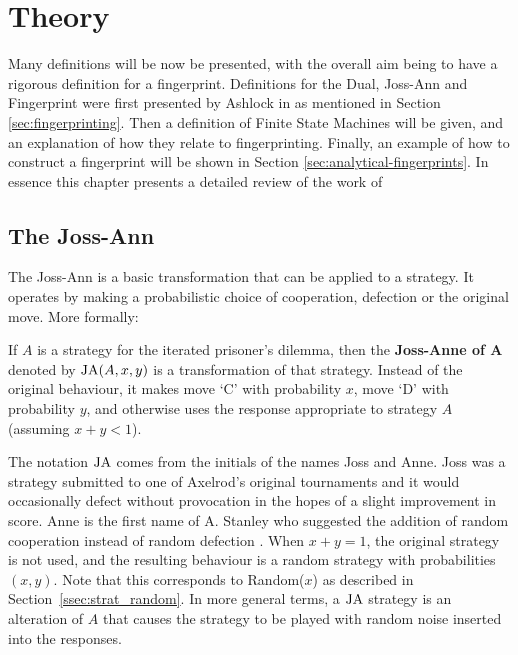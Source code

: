 
\chapter{Theory}\label{cha:theory}

Many definitions will be now be presented, with the overall aim being to have a rigorous definition for a fingerprint.
Definitions for the Dual, Joss-Ann and Fingerprint were first presented by Ashlock in \cite{Ashlock2004} as mentioned in Section \ref{sec:fingerprinting}.
Then a definition of Finite State Machines will be given, and an explanation of how they relate to fingerprinting.
Finally, an example of how to construct a fingerprint will be shown in Section \ref{sec:analytical-fingerprints}.
In essence this chapter presents a detailed review of the work of
\cite{Ashlock...}  %

\section{The Joss-Ann}\label{sec:joss-ann}
The Joss-Ann is a basic transformation that can be applied to a strategy.
It operates by making a probabilistic choice of cooperation, defection or the original move.
More formally:

\begin{definition}\label{def:joss-ann}
If $A$ is a strategy for the iterated prisoner's dilemma, then the
\textbf{Joss-Anne of A} denoted by $\text{JA}(A, x, y)$ is a transformation of that strategy.
Instead of the original behaviour, it makes move `C' with probability $x$, move
`D' with probability $y$, and otherwise uses the response appropriate to
strategy $A$ (assuming $x+y < 1$).
\end{definition}

The notation $\text{JA}$ comes from the initials of the names Joss and Anne.
Joss was a strategy submitted to one of Axelrod’s original tournaments and it would occasionally defect without provocation in the hopes of a slight improvement in score.
Anne is the first name of A. Stanley who suggested the addition of random cooperation instead of random defection \cite{Ashlock2008}.
When $x + y = 1$, the original strategy is not used, and the resulting behaviour
is a random strategy with probabilities $(x, y)$. Note that this corresponds to
Random($x$) as described in Section~\ref{ssec:strat_random}.
In more general terms, a $\text{JA}$ strategy is an alteration of $A$ that causes the strategy to be played with random noise inserted into the responses.

